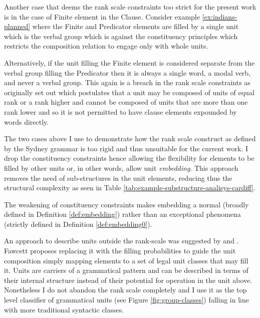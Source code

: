Another case that deems the rank scale constraints too strict for the present work is in the case of Finite element in the Clause. Consider example \ref{ex:indians-planned} where the Finite and Predicator elements are filled by a single unit which is the verbal group which is against the constituency principles which restricts the composition relation to engage only with whole units. 

Alternatively, if the unit filling the Finite element is considered separate from the verbal group filling the Predicator then it is always a single word, a modal verb, and never a verbal group. This again is a breach in the rank scale constraints as originally set out which postulates that a unit may be composed of units of equal rank or a rank higher and cannot be composed of units that are more than one rank lower and so it is not permitted to have clause elements expounded by words directly. 


The two cases above I use to demonstrate how the rank scale construct as defined by the Sydney grammar is too rigid and thus unsuitable for the current work. 
I drop the constituency constraints hence allowing the flexibility for elements to be filled by other units or, in other words, allow unit \textit{embedding}. This approach removes the need of sub-structures in the unit elements, reducing thus the structural complexity as seen in Table \ref{tab:example-substructure-analisys-cardiff}.


The weakening of constituency constraints makes embedding a normal (broadly defined in Definition \ref{def:embedding}) rather than an exceptional phenomena (strictly defined in Definition \ref{def:embedding0}). 

An approach to describe units outside the rank-scale was suggested by \cite{Fawcett2000} and \cite{Butler1985}. Fawcett proposes replacing it with the filling probabilities to guide the unit composition simply mapping elements to a set of legal unit classes that may fill it. Units are carriers of a grammatical pattern and can be described in terms of their internal structure instead of their potential for operation in the unit above. Nonetheless I do not abandon the rank scale completely and I use it as the top level classifier of grammatical units (see Figure \ref{fig:group-classes}) falling in line with more traditional syntactic classes.

